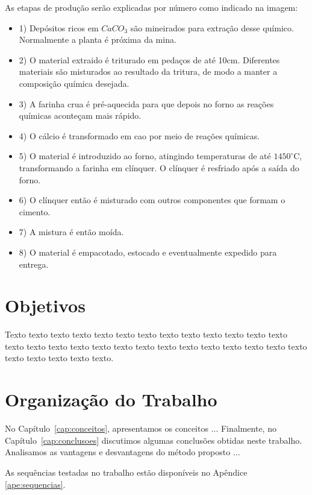 As etapas de produção serão explicadas por número como indicado na imagem: \\

\begin{itemize}

\item[] 1) Depósitos ricos em $CaCO_3$ são mineirados para extração desse químico. Normalmente a planta é próxima da mina.
\item[] 2) O material extraido é triturado em pedaços de até 10cm. Diferentes materiais são misturados ao resultado da tritura, de modo a manter a composição química desejada. 
\item[] 3) A farinha crua é pré-aquecida para que depois no forno as reações químicas aconteçam mais rápido. 
\item[] 4) O cálcio é transformado em cao por meio de reações químicas.  
\item[] 5) O material é introduzido ao forno, atingindo temperaturas de até $1450^\circ$C, transformando a farinha em clínquer. O clínquer é resfriado após a saída do forno. 
\item[] 6) O clínquer então é misturado com outros componentes que formam o cimento.
\item[] 7) A mistura é então moída.
\item[] 8) O material é empacotado, estocado e eventualmente expedido para entrega.

\end{itemize}


\section{Objetivos}
\label{sec:objetivo}

Texto texto texto texto texto texto texto texto texto texto texto texto texto
texto texto texto texto texto texto texto texto texto texto texto texto texto
texto texto texto texto texto texto.


\section{Organização do Trabalho}
\label{sec:organizacao_trabalho}

No Capítulo~\ref{cap:conceitos}, apresentamos os conceitos ... Finalmente, no
Capítulo~\ref{cap:conclusoes} discutimos algumas conclusões obtidas neste
trabalho. Analisamos as vantagens e desvantagens do método proposto ... 

As sequências testadas no trabalho estão disponíveis no Apêndice \ref{ape:sequencias}.
